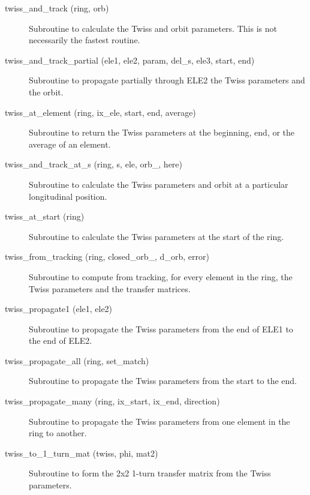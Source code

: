 \begin{description}
\item[twiss\_and\_track (ring, orb)] \Newline
Subroutine to calculate the Twiss and orbit parameters. 
This is not necessarily the fastest routine. 

\item[twiss\_and\_track\_partial (ele1, ele2, param, del\_s, ele3, start, end)] \Newline
Subroutine to propagate partially through ELE2 the Twiss parameters and the orbit. 

\item[twiss\_at\_element (ring, ix\_ele, start, end, average)] \Newline
Subroutine to return the Twiss parameters at the beginning, end, or the average of an element. 

\item[twiss\_and\_track\_at\_s (ring, s, ele, orb\_, here)] \Newline
Subroutine to calculate the Twiss parameters and orbit at a particular longitudinal position. 

\item[twiss\_at\_start (ring)] \Newline
Subroutine to calculate the Twiss parameters at the start of the ring. 

\item[twiss\_from\_tracking (ring, closed\_orb\_, d\_orb, error)] \Newline
Subroutine to compute from tracking, for every element in the ring, 
the Twiss parameters and the transfer matrices. 

\item[twiss\_propagate1 (ele1, ele2)] \Newline
Subroutine to propagate the Twiss parameters from the end of ELE1 to the end of ELE2. 

\item[twiss\_propagate\_all (ring, set\_match)] \Newline
Subroutine to propagate the Twiss parameters from the start to the end. 

\item[twiss\_propagate\_many (ring, ix\_start, ix\_end, direction)] \Newline
Subroutine to propagate the Twiss parameters from one element in the ring to another. 

\item[twiss\_to\_1\_turn\_mat (twiss, phi, mat2)] \Newline
Subroutine to form the 2x2 1-turn transfer matrix from the Twiss parameters. 

\end{description}

